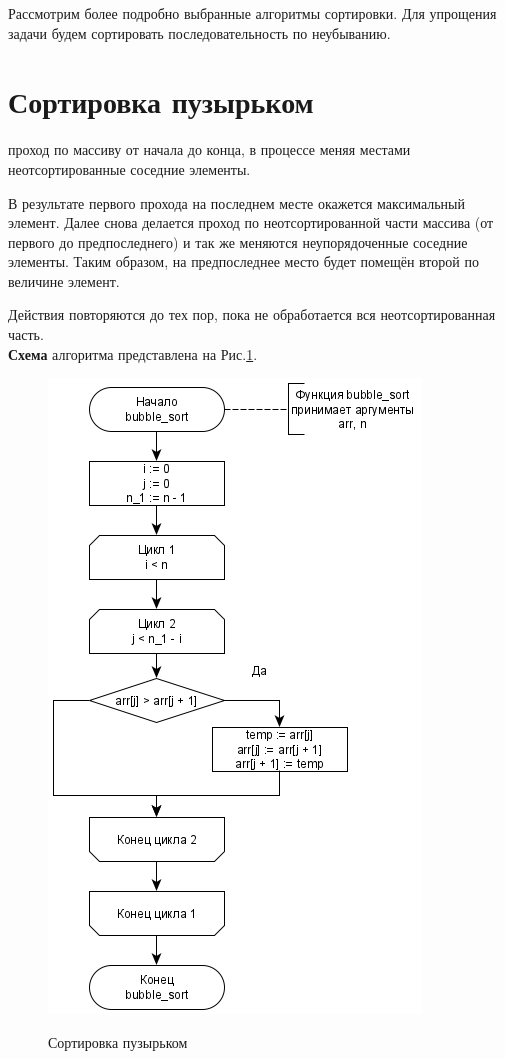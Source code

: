 Рассмотрим более подробно выбранные алгоритмы сортировки. Для упрощения задачи будем сортировать последовательность по неубыванию. 
\section{Сортировка пузырьком}
 проход по массиву от начала до конца, в процессе меняя местами неотсортированные соседние элементы.

В результате первого прохода на последнем месте окажется максимальный элемент. Далее снова делается проход по неотсортированной части массива (от первого до предпоследнего) и так же меняются неупорядоченные соседние элементы. Таким образом, на предпоследнее место будет помещён второй по величине элемент.

Действия повторяются до тех пор, пока не обработается вся неотсортированная часть. \\

\textbf{Схема} алгоритма представлена на Рис.\ref{fig1:image}.
\begin{figure}[h]
	\begin{center}
		{\includegraphics[scale = 0.519]{schemes/bubble}}
		\caption{Сортировка пузырьком}
		\label{fig1:image}
	\end{center}
\end{figure}

